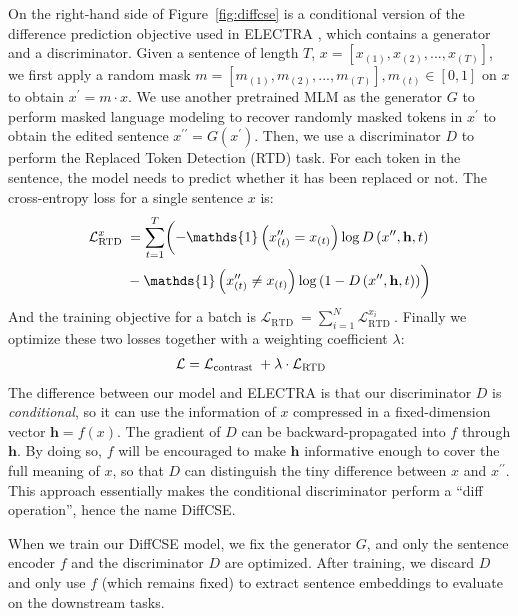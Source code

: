 \documentclass[11pt]{article}
\newcommand{\diffcse}{DiffCSE\xspace}
\begin{document}
On the right-hand side of Figure~\ref{fig:diffcse} is a conditional version of the difference prediction objective used in ELECTRA \cite{clark2020electra}, which contains a generator and a discriminator. Given a sentence of length $T$, $x=[x_{(1)}, x_{(2)}, ..., x_{(T)}]$, we first apply a random mask $m=[m_{(1)}, m_{(2)}, ..., m_{(T)}], m_{(t)} \in [0, 1]$ on $x$ to obtain $x^\prime = m \cdot x$. We use another pretrained MLM as the generator $G$ to perform masked language modeling to recover randomly masked tokens in $x^\prime$ to obtain the edited sentence $x^{\prime\prime}=G(x^\prime)$. Then, we use a discriminator $D$ to perform the Replaced Token Detection (RTD) task. For each token in the sentence, the model needs to predict whether it has been replaced or not. The cross-entropy loss for a single sentence $x$ is:
\vspace{-5pt}
\begin{align*}
    \mathcal{L}^x_{\text {RTD }}&=\sum_{t=1}^{T}\biggl(-\mathds{1}\left(x_{(t)}^{\prime\prime}=x_{(t)}\right) \log D\left(x^{\prime\prime}, \mathbf{h}, t\right) \\
    &-\mathds{1}\left(x_{(t)}^{\prime\prime} \neq x_{(t)}\right) \log \left(1-D\left(x^{\prime\prime}, \mathbf{h}, t\right)\right)\biggr)
    \vspace{-5pt}
\end{align*}
And the training objective for a batch is $\mathcal{L}_{\text {RTD }}= \sum_{i=1}^{N}\mathcal{L}^{x_i}_{\text {RTD }}$.
Finally we optimize these two losses together with a weighting coefficient $\lambda$:
\vspace{-5pt}
\begin{align*}
    \mathcal{L}&= \mathcal{L}_{\text {contrast }} + \lambda \cdot \mathcal{L}_{\text {RTD }}
    \vspace{-5pt}
\end{align*}
The difference between our model and ELECTRA is that our discriminator $D$ is \emph{conditional}, so it can use the information of $x$ compressed in a fixed-dimension vector $\mathbf{h} = f\left(x\right)$. The gradient of $D$ can be backward-propagated into $f$ through $\mathbf{h}$. By doing so, $f$ will be encouraged to make $\mathbf{h}$ informative enough to cover the full meaning of $x$, so that $D$ can distinguish the tiny difference between $x$ and $x^{\prime\prime}$. This approach essentially makes the conditional discriminator perform a ``diff operation'', hence the name DiffCSE.

When we train our \diffcse model, we fix the generator $G$, and only the sentence encoder $f$ and the discriminator $D$ are optimized. After training, we discard $D$ and only use $f$ (which remains fixed) to extract sentence embeddings to evaluate on the downstream tasks.
\end{document}
